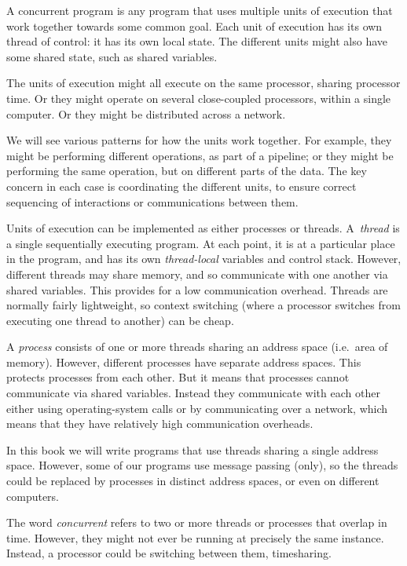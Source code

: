 A concurrent program is any program that uses multiple units of execution that
work together towards some common goal.  Each unit of execution has its own
thread of control: it has its own local state.  The different units might also
have some shared state, such as shared variables.

The units of execution might all execute on the same processor, sharing
processor time.  Or they might operate on several close-coupled processors,
within a single computer.  Or they might be distributed across a network.

We will see various patterns for how the units work together.  For example,
they might be performing different operations, as part of a pipeline; or they
might be performing the same operation, but on different parts of the data.
%
The key concern in each case is coordinating the different units, to ensure
correct sequencing of interactions or communications between them.


Units of execution can be implemented as either processes or threads.
%
A~\emph{thread} is a single sequentially executing program.  At
each point, it is at a particular place in the program, and has its
own \emph{thread-local} variables and control stack.  However, different
threads may share memory, and so communicate with one another via shared
variables.  This provides for a low communication overhead.  Threads are
normally fairly lightweight, so context switching (where a processor switches
from executing one thread to another) can be cheap.

A \emph{process} consists of one or more threads sharing an
address space (i.e.~area of memory).  However, different processes have
separate address spaces.  This protects processes from each other.  But it
means that processes cannot communicate via shared variables.  Instead they
communicate with each other either using operating-system calls or by
communicating over a network, which means that they have relatively high
communication overheads.

In this book we will write programs that use threads sharing a single address
space.  However, some of our programs use message passing (only), so the
threads could be replaced by processes in distinct address spaces, or even on
different computers.

The word \emph{concurrent} refers to two or more threads or
processes that overlap in time.  However, they might not ever be running at
precisely the same instance.  Instead, a processor could be switching between
them, timesharing.

